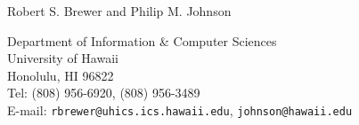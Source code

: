 

\vspace*{1in}
\pagestyle{empty}

\begin{center}
  
        \bigskip
                     
         Robert S. Brewer and Philip M. Johnson \bigskip

         Department of Information \& Computer Sciences\\
         University of Hawaii\\
         Honolulu, HI 96822\\
         Tel: (808) 956-6920, (808) 956-3489\\
         E-mail: {\tt rbrewer@uhics.ics.hawaii.edu}, {\tt johnson@hawaii.edu}
         
         \bigskip

\end{center}


